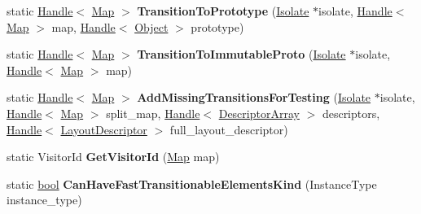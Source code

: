 \begin{DoxyCompactItemize}
static \mbox{\hyperlink{classv8_1_1internal_1_1Handle}{Handle}}$<$ \mbox{\hyperlink{classv8_1_1internal_1_1Map}{Map}} $>$ {\bfseries Transition\+To\+Prototype} (\mbox{\hyperlink{classv8_1_1internal_1_1Isolate}{Isolate}} $\ast$isolate, \mbox{\hyperlink{classv8_1_1internal_1_1Handle}{Handle}}$<$ \mbox{\hyperlink{classv8_1_1internal_1_1Map}{Map}} $>$ map, \mbox{\hyperlink{classv8_1_1internal_1_1Handle}{Handle}}$<$ \mbox{\hyperlink{classv8_1_1internal_1_1Object}{Object}} $>$ prototype)
\item 
\mbox{\label{classv8_1_1internal_1_1Map_aa49209dde8a8bd160838e9412eb281f8}} 
static \mbox{\hyperlink{classv8_1_1internal_1_1Handle}{Handle}}$<$ \mbox{\hyperlink{classv8_1_1internal_1_1Map}{Map}} $>$ {\bfseries Transition\+To\+Immutable\+Proto} (\mbox{\hyperlink{classv8_1_1internal_1_1Isolate}{Isolate}} $\ast$isolate, \mbox{\hyperlink{classv8_1_1internal_1_1Handle}{Handle}}$<$ \mbox{\hyperlink{classv8_1_1internal_1_1Map}{Map}} $>$ map)
\item 
\mbox{\label{classv8_1_1internal_1_1Map_a281314dc8124b3f650acee1a22dcece7}} 
static \mbox{\hyperlink{classv8_1_1internal_1_1Handle}{Handle}}$<$ \mbox{\hyperlink{classv8_1_1internal_1_1Map}{Map}} $>$ {\bfseries Add\+Missing\+Transitions\+For\+Testing} (\mbox{\hyperlink{classv8_1_1internal_1_1Isolate}{Isolate}} $\ast$isolate, \mbox{\hyperlink{classv8_1_1internal_1_1Handle}{Handle}}$<$ \mbox{\hyperlink{classv8_1_1internal_1_1Map}{Map}} $>$ split\+\_\+map, \mbox{\hyperlink{classv8_1_1internal_1_1Handle}{Handle}}$<$ \mbox{\hyperlink{classv8_1_1internal_1_1DescriptorArray}{Descriptor\+Array}} $>$ descriptors, \mbox{\hyperlink{classv8_1_1internal_1_1Handle}{Handle}}$<$ \mbox{\hyperlink{classv8_1_1internal_1_1LayoutDescriptor}{Layout\+Descriptor}} $>$ full\+\_\+layout\+\_\+descriptor)
\item 
\mbox{\label{classv8_1_1internal_1_1Map_a937ffd2f70b1d21ff68d67846f2d1a2f}} 
static Visitor\+Id {\bfseries Get\+Visitor\+Id} (\mbox{\hyperlink{classv8_1_1internal_1_1Map}{Map}} map)
\item 
\mbox{\label{classv8_1_1internal_1_1Map_a8bc363923d09c6f38ede58285d3401b4}} 
static \mbox{\hyperlink{classbool}{bool}} {\bfseries Can\+Have\+Fast\+Transitionable\+Elements\+Kind} (Instance\+Type instance\+\_\+type)
\end{DoxyCompactItemize}
